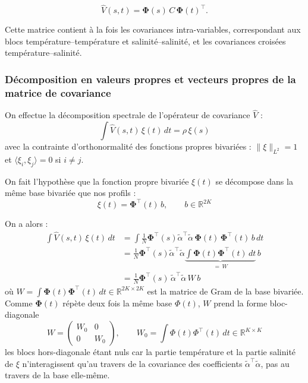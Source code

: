 \documentclass[11pt,a4paper,oneside]{report}
\begin{document}
	$$
	\boxed{
		\hat V(s,t)
		=
		\boldsymbol{\Phi}(s)\,
		C\,
		\boldsymbol{\Phi}(t)^\top.
	}
	$$
	
	Cette matrice contient à la fois les covariances intra-variables, correspondant aux blocs température--température et salinité--salinité, et les covariances croisées température--salinité.
	
	\subsubsection{Décomposition en valeurs propres et vecteurs propres de la matrice de covariance}
	
	On effectue la décomposition spectrale de l'opérateur de covariance $\hat{V}$ :
	\[
	\int \hat{V}(s, t)\,\xi(t)\, dt = \rho\, \xi(s)
	\]
	avec la contrainte d'orthonormalité des fonctions propres bivariées : $\|\xi\|_{L^2} = 1$ et $\langle \xi_i, \xi_j\rangle = 0$ si $i \neq j$.
	
	On fait l'hypothèse que la fonction propre bivariée $\xi(t)$ se décompose dans la même base bivariée que nos profils :
	\[
	\xi(t) = \boldsymbol{\Phi}^\top(t)\, b, \qquad b \in \mathbb{R}^{2K}
	\]
	
	On a alors :
	\begin{align*}
		\int \hat{V}(s, t)\,\xi(t)\,dt 
		&= \int \frac{1}{N} \boldsymbol{\Phi}^\top(s)\tilde{\alpha}^\top \tilde{\alpha}\, \boldsymbol{\Phi}(t)\, \boldsymbol{\Phi}^\top(t)\, b\,dt \\
		&= \frac{1}{N} \boldsymbol{\Phi}^\top(s)\tilde{\alpha}^\top \tilde{\alpha} 
		\underbrace{\int \boldsymbol{\Phi}(t)\boldsymbol{\Phi}^\top(t)\,dt}_{=\, W} \, b \\
		&= \frac{1}{N}\boldsymbol{\Phi}^\top(s)\,\tilde{\alpha}^\top \tilde{\alpha}\, W\, b
	\end{align*}
	où $W = \int \boldsymbol{\Phi}(t)\boldsymbol{\Phi}^\top(t)\,dt \in \mathbb{R}^{2K \times 2K}$ est la matrice de Gram de la base bivariée. Comme $\boldsymbol{\Phi}(t)$ répète deux fois la même base $\Phi(t)$, $W$ prend la forme bloc-diagonale
	\[
	W = \begin{pmatrix} W_0 & 0 \\ 0 & W_0 \end{pmatrix}, 
	\qquad W_0 = \int \Phi(t)\Phi^\top(t)\,dt \in \mathbb{R}^{K \times K}
	\]
	les blocs hors-diagonale étant nuls car la partie température et la partie salinité de $\xi$ n'interagissent qu'au travers de la covariance des coefficients $\tilde\alpha^\top\tilde\alpha$, pas au travers de la base elle-même.
	
\end{document}
